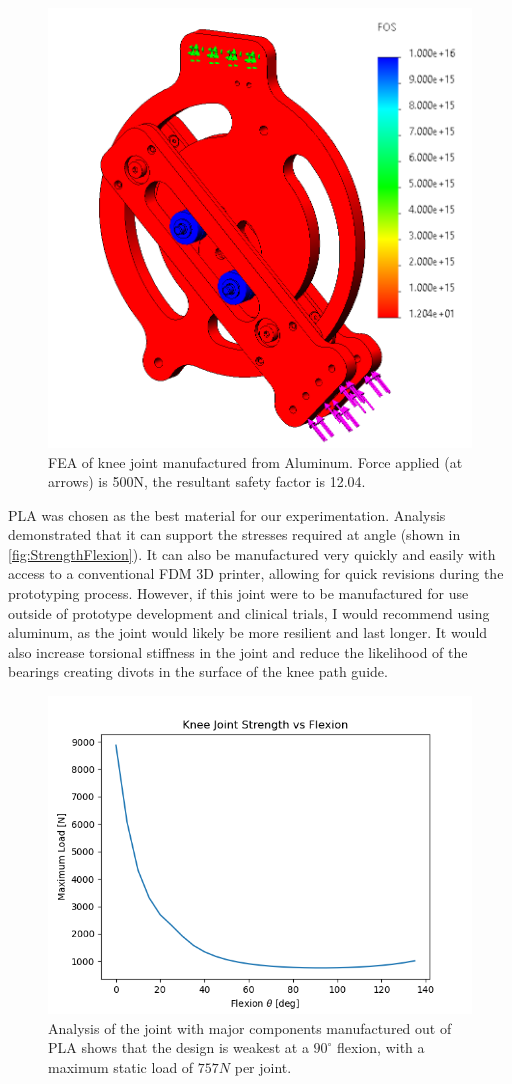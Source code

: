 \begin{figure}[ht!]
    \centering
    \includegraphics[width=0.8\linewidth]{Figures/Design/FEA_AL_45deg.png}
    \caption{FEA of knee joint manufactured from Aluminum. Force applied (at arrows) is 500N, the resultant safety factor is 12.04.}
    \label{fig:FEA_AL}
\end{figure}

PLA was chosen as the best material for our experimentation. Analysis demonstrated that it can support the stresses required at angle (shown in \autoref{fig:StrengthFlexion}). It can also be manufactured very quickly and easily with access to a conventional FDM 3D printer, allowing for quick revisions during the prototyping process. 
However, if this joint were to be manufactured for use outside of prototype development and clinical trials, I would recommend using aluminum, as the joint would likely be more resilient and last longer. It would also increase torsional stiffness in the joint and reduce the likelihood of the bearings creating divots in the surface of the knee path guide.

\begin{figure}[ht!]
    \centering
    \includegraphics[width=0.8\linewidth]{Figures/Design/StrengthFlexionCurve.png}
    \caption{Analysis of the joint with major components manufactured out of PLA shows that the design is weakest at a \(90^\circ\) flexion, with a maximum static load of \(757N\) per joint.}
    \label{fig:StrengthFlexion}
\end{figure}

